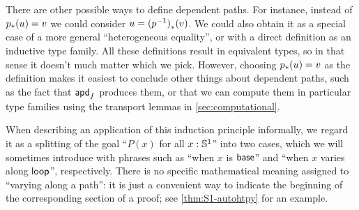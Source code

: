 \documentclass[hott-all.tex]{subfiles}
\begin{document}
% 
\begin{rmk}
There are other possible ways to define dependent paths.
For instance, instead of ${p}_{*}\mathopen{}\left({u}\right)\mathclose{} = v$ we could consider $u = {(\mathord{{p}^{-1}})}_{*}\mathopen{}\left({v}\right)\mathclose{}$.
We could also obtain it as a special case of a more general ``heterogeneous equality'',
%
%
or with a direct definition as an inductive type family.
All these definitions result in equivalent types, so in that sense it doesn't much matter which we pick.
However, choosing ${p}_{*}\mathopen{}\left({u}\right)\mathclose{} = v$ as the definition makes it easiest to conclude other things about dependent paths, such as the fact that $\mathsf{apd}_{f}$ produces them, or that we can compute them in particular type families using the transport lemmas in \cref{sec:computational}.
\end{rmk}
% 
% 
\begin{rmk}
  When describing an application of this induction principle informally, we regard it as a splitting of the goal ``$P(x)$ for all $x:\mathbb{S}^1$'' into two cases, which we will sometimes introduce with phrases such as ``when $x$ is $\mathsf{base}$'' and ``when $x$ varies along $\mathsf{loop}$'', respectively.
  There is no specific mathematical meaning assigned to ``varying along a path'': it is just a convenient way to indicate the beginning of the corresponding section of a proof; see \cref{thm:S1-autohtpy} for an example.
\end{rmk}
% 
\end{document}
